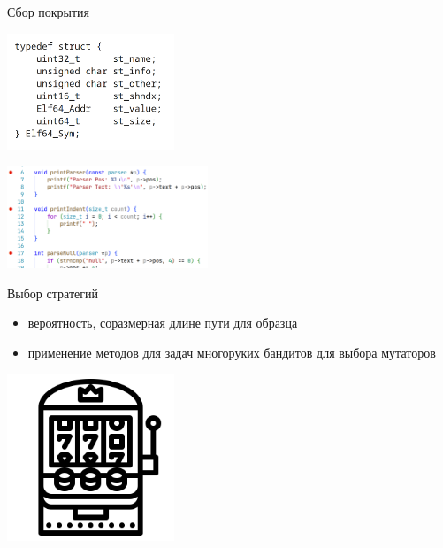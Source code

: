 \documentclass[hyperref={unicode=true}, 12pt]{beamer}
\begin{document}
	\begin{frame}[t]{Сбор покрытия}
		\begin{minipage}{0.5\textwidth}
			
			\vspace{1.5cm}
			
			\includegraphics[width=5cm]{elf-sym.png}
			
		\end{minipage}\begin{minipage}{0.5\textwidth}
			
			\vspace{1.5cm}
			
			\includegraphics[width=6cm]{breakpoints.png}
		\end{minipage}
	\end{frame}

	\begin{frame}[t]{Выбор стратегий}
		\begin{minipage}{0.5\textwidth}
			
			\vspace{1.1cm}
			
			\begin{itemize}
				\item вероятность, соразмерная длине пути для образца
				
				\item применение методов для задач многоруких бандитов для выбора мутаторов
			\end{itemize}
		
			
		\end{minipage}\begin{minipage}{0.5\textwidth}
			
			\vspace{1.1cm}
			\includegraphics[width=5cm]{bandit.png}
		\end{minipage}
	\end{frame}
	
\end{document}

